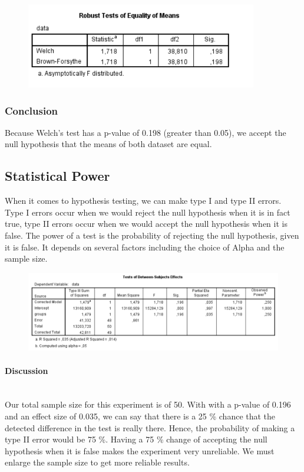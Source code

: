 \documentclass[14]{article}
\begin{document}
\begin{figure}[!htb]
	\includegraphics[width=0.9\textwidth]{img/question3/Welch.PNG}
	\captionsetup{width=1.0\textwidth}
	\centering 
\end{figure}

\subsubsection{Conclusion}
Because Welch's test has a p-value of 0.198 (greater than 0.05), we accept the null hypothesis that the means of both dataset are equal. 

\subsection{Statistical Power}
When it comes to hypothesis testing, we can make type I and type II errors. Type I errors occur when we would reject the null hypothesis when it is in fact true, type II errors occur when we would accept the null hypothesis when it is false.
The power of a test is the probability of rejecting the null hypothesis, given it is false. It depends on several factors including the choice of Alpha and the sample size.

\begin{figure}[!htb]
	\includegraphics[width=1.0\textwidth]{img/question3/Power.PNG}
	\captionsetup{width=1.0\textwidth}
	\centering 
\end{figure}

\paragraph{Discussion}\mbox{}\\
Our total sample size for this experiment is of 50. With with a p-value of 0.196 and an effect size of 0.035, we can say that there is a 25 \% chance that the detected difference in the test is really there. Hence, the probability of making a type II error would be 75 \%.
\newline 
Having a 75 \% change of accepting the null hypothesis when it is false makes the experiment very unreliable. We must enlarge the sample size to get more reliable results.
\end{document}
